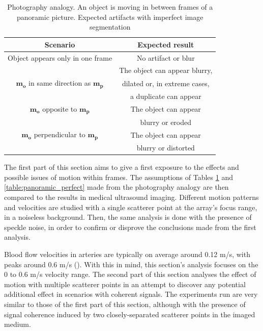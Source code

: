 \begin{table}[!ht]
\centering
\begin{tabular}{| c | c |}
  \hline
  \textbf{Scenario}  &   \textbf{Expected result} \\
  \hline
  Object appears only in one frame    &   No artifact or blur \\
  \hline
    &  The object can appear blurry, \\
  $\boldsymbol{m_o}$ in same direction as $\boldsymbol{m_p}$  &   dilated or, in extreme cases,  \\
    &   a duplicate can appear   \\
  \hline
  $\boldsymbol{m_o}$ opposite to $\boldsymbol{m_p}$    &  The object can appear \\
    &   blurry or eroded  \\
  \hline
  $\boldsymbol{m_o}$ perpendicular to $\boldsymbol{m_p}$    &   The object can appear \\
    &   blurry or distorted \\
  \hline
 \end{tabular}
\caption{Photography analogy. An object is moving in between frames of a panoramic picture. Expected artifacts with imperfect image segmentation}
\label{table:panoramic_imperfect}
\end{table}

The first part of this section aims to give a first exposure to the effects and possible issues of motion within frames. The assumptions of Tables \ref{table:panoramic_imperfect} and \ref{table:panoramic_perfect} made from the photography analogy are then compared to the results in medical ultrasound imaging. Different motion patterns and velocities are studied with a single scatterer point at the array's focus range, in a noiseless background. Then, the same analysis is done with the presence of speckle noise, in order to confirm or disprove the conclusions made from the first analysis.

Blood flow velocities in arteries are typically on average around 0.12 m/s, with peaks around 0.6 m/s (\cite{Blood_flow}). With this in mind, this section's analysis focuses on the 0 to 0.6 m/s velocity range.
The second part of this section analyses the effect of motion with multiple scatterer points in an attempt to discover any potential additional effect in scenarios with coherent signals. The experiments run are very similar to those of the first part of this section, although with the presence of signal coherence induced by two closely-separated scatterer points in the imaged medium.


